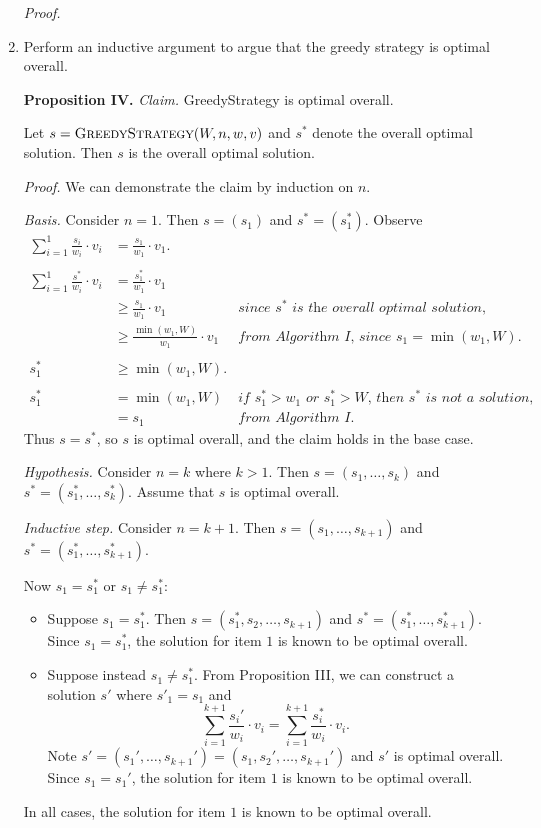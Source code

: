 \begin{enumerate}
\begin{solution}
\textit{Proof. }

\end{solution}
\item Perform an inductive argument to argue that the greedy strategy is optimal overall.
\begin{solution}
\textbf{Proposition IV. }\textit{Claim. }{\sc GreedyStrategy} is optimal overall.

Let $s=\textsc{GreedyStrategy}(W,n,w,v)$ and $s^*$ denote the overall optimal solution. Then $s$ is the overall optimal solution.

\textit{Proof. }We can demonstrate the claim by induction on $n$.

\textit{Basis. }Consider $n=1$. Then $s=(s_1)$ and $s^*=(s_1^*)$. Observe
\begin{align*}
\sum_{i=1}^1\frac{s_i}{w_i}\cdot v_i&=\frac{s_1}{w_1}\cdot v_1.\\\\
\sum_{i=1}^1\frac{s^*}{w_i}\cdot v_i
&=\frac{s_1^*}{w_1}\cdot v_1\\
&\geq\frac{s_1}{w_1}\cdot v_1&\textit{since $s^*$ is the overall optimal solution,}\\
&\geq\frac{\min(w_1,W)}{w_1}\cdot v_1&\textit{from Algorithm I, since $s_1=\min(w_1,W)$.}\\\\
s_1^*&\geq\min(w_1,W).\\\\
s_1^*&=\min(w_1,W)&\textit{if $s_1^*>w_1$ or $s_1^*>W$, then $s^*$ is not a solution,}\\
&=s_1&\textit{from Algorithm I.}
\end{align*}
Thus $s=s^*$, so $s$ is optimal overall, and the claim holds in the base case.

\textit{Hypothesis. }Consider $n=k$ where $k>1$. Then $s=(s_1,\dots,s_k)$ and $s^*=(s_1^*,\dots,s_k^*)$. Assume that $s$ is optimal overall.

\textit{Inductive step. }Consider $n=k+1$. Then $s=(s_1,\dots,s_{k+1})$ and $s^*=(s_1^*,\dots,s_{k+1}^*)$. 

Now $s_1=s_1^*$ or $s_1\neq s_1^*$:
\begin{itemize}
    \item Suppose $s_1=s_1^*$. Then $s=(s_1^*,s_2,\dots,s_{k+1})$ and $s^*=(s_1^*,\dots,s_{k+1}^*)$. Since $s_1=s_1^*$, the solution for item $1$ is known to be optimal overall. 
     \item Suppose instead $s_1\neq s_1^*$. 
     From Proposition III, we can construct a solution $s'$ where $s'_1=s_1$ and \[\sum_{i=1}^{k+1}\frac{s_i'}{w_i}\cdot v_i=\sum_{i=1}^{k+1}\frac{s_i^*}{w_i}\cdot v_i.\] Note $s'=(s_1',\dots,s_{k+1}')=(s_1,s_2',\dots,s_{k+1}')$ and $s'$ is optimal overall. Since $s_1=s_1'$, the solution for item $1$ is known to be optimal overall.
\end{itemize}
In all cases, the solution for item $1$ is known to be optimal overall.


\end{solution}
\end{enumerate}
